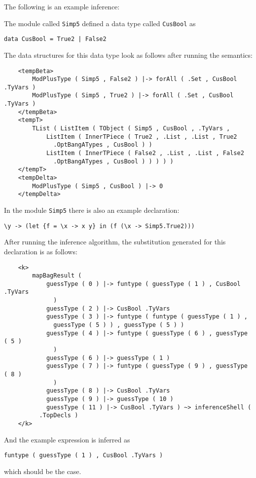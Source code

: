 The following is an example inference:

The module called \texttt{Simp5} defined a data type called \texttt{CusBool} as

\begin{lstlisting}
data CusBool = True2 | False2
\end{lstlisting}

The data structures for this data type look as follows after running the semantics:

\begin{lstlisting}
    <tempBeta>
        ModPlusType ( Simp5 , False2 ) |-> forAll ( .Set , CusBool .TyVars )
        ModPlusType ( Simp5 , True2 ) |-> forAll ( .Set , CusBool .TyVars )
    </tempBeta>
    <tempT>
        TList ( ListItem ( TObject ( Simp5 , CusBool , .TyVars , 
            ListItem ( InnerTPiece ( True2 , .List , .List , True2 
              .OptBangATypes , CusBool ) )
            ListItem ( InnerTPiece ( False2 , .List , .List , False2 
              .OptBangATypes , CusBool ) ) ) ) )
    </tempT>
    <tempDelta>
        ModPlusType ( Simp5 , CusBool ) |-> 0
    </tempDelta>

\end{lstlisting}

In the module \texttt{Simp5} there is also an example declaration:

\begin{lstlisting}
\y -> (let {f = \x -> x y} in (f (\x -> Simp5.True2)))
\end{lstlisting}

After running the inference algorithm, the substitution generated for this declaration is as follows:

\begin{lstlisting}
    <k>
        mapBagResult ( 
            guessType ( 0 ) |-> funtype ( guessType ( 1 ) , CusBool .TyVars 
              )
            guessType ( 2 ) |-> CusBool .TyVars
            guessType ( 3 ) |-> funtype ( funtype ( guessType ( 1 ) , 
              guessType ( 5 ) ) , guessType ( 5 ) )
            guessType ( 4 ) |-> funtype ( guessType ( 6 ) , guessType ( 5 ) 
              )
            guessType ( 6 ) |-> guessType ( 1 )
            guessType ( 7 ) |-> funtype ( guessType ( 9 ) , guessType ( 8 ) 
              )
            guessType ( 8 ) |-> CusBool .TyVars
            guessType ( 9 ) |-> guessType ( 10 )
            guessType ( 11 ) |-> CusBool .TyVars ) ~> inferenceShell ( 
          .TopDecls )
    </k>
\end{lstlisting}

And the example expression is inferred as 

\begin{lstlisting}
funtype ( guessType ( 1 ) , CusBool .TyVars )
\end{lstlisting}

\noindent
which should be the case.